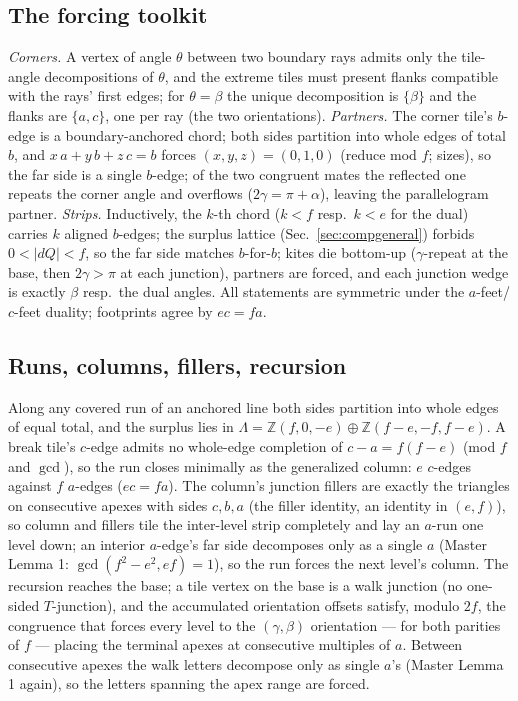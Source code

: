 \documentclass[11pt,reqno]{amsart}
\theoremstyle{plain}
\theoremstyle{definition}
\begin{document}
\subsection{The forcing toolkit}
\emph{Corners.} A vertex of angle $\theta$ between two boundary rays admits only the tile-angle
decompositions of $\theta$, and the extreme tiles must present flanks compatible with the rays'
first edges; for $\theta=\beta$ the unique decomposition is $\{\beta\}$ and the flanks are
$\{a,c\}$, one per ray (the two orientations). \emph{Partners.} The corner tile's $b$-edge is a
boundary-anchored chord; both sides partition into whole edges of total $b$, and
$x\,a+y\,b+z\,c=b$ forces $(x,y,z)=(0,1,0)$ (reduce mod $f$; sizes), so the far side is a single
$b$-edge; of the two congruent mates the reflected one repeats the corner angle and overflows
($2\gamma=\pi+\alpha$), leaving the parallelogram partner. \emph{Strips.} Inductively, the $k$-th
chord ($k<f$ resp.\ $k<e$ for the dual) carries $k$ aligned $b$-edges; the surplus lattice
(Sec.~\ref{sec:compgeneral}) forbids $0<|dQ|<f$, so the far side matches $b$-for-$b$; kites die
bottom-up ($\gamma$-repeat at the base, then $2\gamma>\pi$ at each junction), partners are forced,
and each junction wedge is exactly $\beta$ resp.\ the dual angles. All statements are symmetric
under the $a$-feet/$c$-feet duality; footprints agree by $ec=fa$.

\subsection{Runs, columns, fillers, recursion}
Along any covered run of an anchored line both sides partition into whole edges of equal total,
and the surplus lies in $\Lambda=\mathbb Z(f,0,-e)\oplus\mathbb Z(f{-}e,-f,f{-}e)$. A break tile's
$c$-edge admits no whole-edge completion of $c-a=f(f-e)$ (mod $f$ and $\gcd$), so the run closes
minimally as the generalized column: $e$ $c$-edges against $f$ $a$-edges ($ec=fa$). The column's
junction fillers are exactly the triangles on consecutive apexes with sides $c,b,a$ (the filler
identity, an identity in $(e,f)$), so column and fillers tile the inter-level strip completely and
lay an $a$-run one level down; an interior $a$-edge's far side decomposes only as a single $a$
(Master Lemma 1: $\gcd(f^2-e^2,ef)=1$), so the run forces the next level's column. The recursion
reaches the base; a tile vertex on the base is a walk junction (no one-sided $T$-junction), and
the accumulated orientation offsets satisfy, modulo $2f$, the congruence that forces every level
to the $(\gamma,\beta)$ orientation --- for both parities of $f$ --- placing the terminal apexes
at consecutive multiples of $a$. Between consecutive apexes the walk letters decompose only as
single $a$'s (Master Lemma 1 again), so the letters spanning the apex range are forced.
\end{document}
